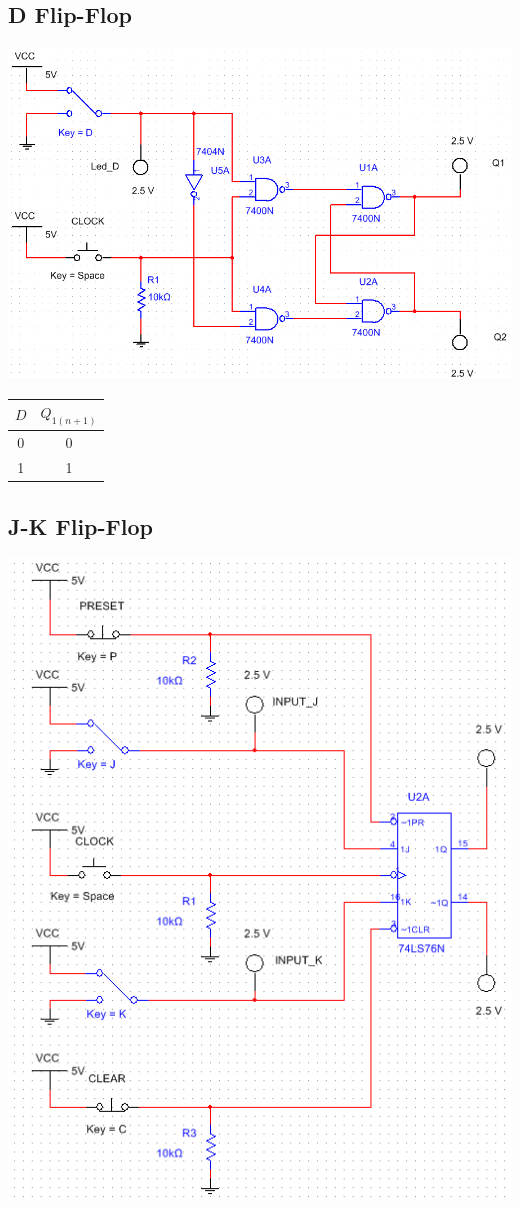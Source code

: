 \documentclass{article}
\begin{document}
\subsection{D Flip-Flop}
\includegraphics[width=\textwidth]{./res/dff.png}

\begin{center}
\begin{tabular}{|c|c|}
	\hline
	$D$ & $Q_{1(n+1)}$ \\
	\hline
	0 & 0 \\
	1 & 1 \\
	\hline
\end{tabular}
\end{center}

\subsection{J-K Flip-Flop}
\includegraphics[width=\textwidth]{./res/jkff.png}
\end{document}
